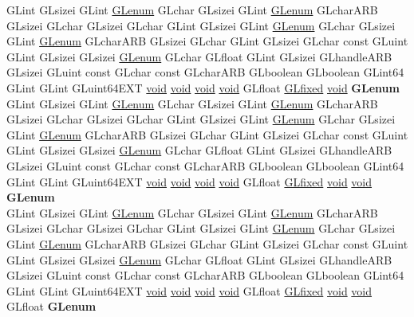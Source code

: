 \begin{DoxyCompactItemize}
\begin{tabbing}
\>GLint GLsizei GLint \hyperlink{interfacevoid}{GLenum} GLchar GLsizei GLint \hyperlink{interfacevoid}{GLenum} GLcharARB GLsizei GLchar GLsizei GLchar GLint GLsizei GLint \hyperlink{interfacevoid}{GLenum} GLchar GLsizei GLint \hyperlink{interfacevoid}{GLenum} GLcharARB GLsizei GLchar GLint GLsizei GLchar const GLuint GLint GLsizei GLsizei \hyperlink{interfacevoid}{GLenum} GLchar GLfloat GLint GLsizei GLhandleARB GLsizei GLuint const GLchar const GLcharARB GLboolean GLboolean GLint64 GLint GLint GLuint64EXT \hyperlink{interfacevoid}{void} \hyperlink{interfacevoid}{void} \hyperlink{interfacevoid}{void} \hyperlink{interfacevoid}{void} GLfloat \hyperlink{glheader_8h_ad6d3fa892df40dedf48ee6d84529ae5e}{GLfixed} \hyperlink{interfacevoid}{void} {\bfseries GLenum}\\
\>GLint GLsizei GLint \hyperlink{interfacevoid}{GLenum} GLchar GLsizei GLint \hyperlink{interfacevoid}{GLenum} GLcharARB GLsizei GLchar GLsizei GLchar GLint GLsizei GLint \hyperlink{interfacevoid}{GLenum} GLchar GLsizei GLint \hyperlink{interfacevoid}{GLenum} GLcharARB GLsizei GLchar GLint GLsizei GLchar const GLuint GLint GLsizei GLsizei \hyperlink{interfacevoid}{GLenum} GLchar GLfloat GLint GLsizei GLhandleARB GLsizei GLuint const GLchar const GLcharARB GLboolean GLboolean GLint64 GLint GLint GLuint64EXT \hyperlink{interfacevoid}{void} \hyperlink{interfacevoid}{void} \hyperlink{interfacevoid}{void} \hyperlink{interfacevoid}{void} GLfloat \hyperlink{glheader_8h_ad6d3fa892df40dedf48ee6d84529ae5e}{GLfixed} \hyperlink{interfacevoid}{void} \hyperlink{interfacevoid}{void} {\bfseries GLenum}\\
\>GLint GLsizei GLint \hyperlink{interfacevoid}{GLenum} GLchar GLsizei GLint \hyperlink{interfacevoid}{GLenum} GLcharARB GLsizei GLchar GLsizei GLchar GLint GLsizei GLint \hyperlink{interfacevoid}{GLenum} GLchar GLsizei GLint \hyperlink{interfacevoid}{GLenum} GLcharARB GLsizei GLchar GLint GLsizei GLchar const GLuint GLint GLsizei GLsizei \hyperlink{interfacevoid}{GLenum} GLchar GLfloat GLint GLsizei GLhandleARB GLsizei GLuint const GLchar const GLcharARB GLboolean GLboolean GLint64 GLint GLint GLuint64EXT \hyperlink{interfacevoid}{void} \hyperlink{interfacevoid}{void} \hyperlink{interfacevoid}{void} \hyperlink{interfacevoid}{void} GLfloat \hyperlink{glheader_8h_ad6d3fa892df40dedf48ee6d84529ae5e}{GLfixed} \hyperlink{interfacevoid}{void} \hyperlink{interfacevoid}{void} GLfloat {\bfseries GLenum}\\

\end{tabbing}
\end{DoxyCompactItemize}
